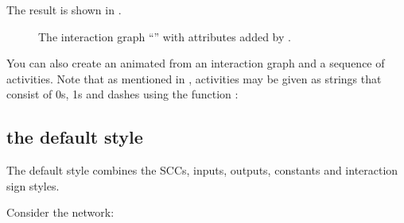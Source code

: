 \documentclass[letterpaper,10pt,english]{sphinxmanual}
\begin{document}
The result is shown in {\hyperref[\detokenize{Manual:figure08}]{}}.

\begin{figure}[htbp]
\centering
\capstart

\noindent{}
\caption{The interaction graph “” with attributes added by {\hyperref[\detokenize{InteractionGraphs:add-style-activities}]{}}.}\label{\detokenize{Manual:figure08}}\label{\detokenize{Manual:id12}}\end{figure}

You can also create an animated  from an interaction graph and a sequence of activities.
Note that as mentioned in {\hyperref[\detokenize{Manual:states-subspaces-paths}]{}}, activities may be given as strings that consist of 0s, 1s and dashes
using the function {\hyperref[\detokenize{InteractionGraphs:activities2animation}]{}}:

\begin{sphinxVerbatim}[commandchars=\\\{\}]
  \PYG{p}{[}  \PYG{p}{]}
  
\end{sphinxVerbatim}


\subsection{the default style}
\label{\detokenize{Manual:the-default-style}}
The default style combines the SCCs, inputs, outputs, constants and interaction sign styles.

Consider the network:
\end{document}
